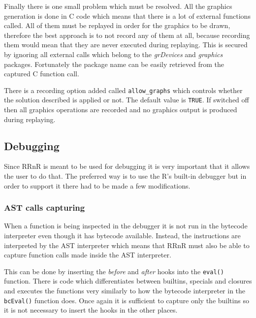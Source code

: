 \documentclass[thesis=M,english,hidelinks]{FITthesis}[2012/10/20]
\begin{document}
		Finally there is one small problem which must be resolved. All the graphics generation is done in C code which means that there is a lot of external functions called. All of them must be replayed in order for the graphics to be drawn, therefore the best approach is to not record any of them at all, because recording them would mean that they are never executed during replaying. This is secured by ignoring all external calls which belong to the \emph{grDevices} and \emph{graphics} packages. Fortunately the package name can be easily retrieved from the captured C function call.\par
		
		There is a recording option added called \lstinline|allow_graphs| which controls whether the solution described is applied or not. The default value is \lstinline|TRUE|. If switched off then all graphics operations are recorded and no graphics output is produced during replaying.\par
		
		\subsection{Debugging}
		Since RRnR is meant to be used for debugging it is very important that it allows the user to do that. The preferred way is to use the R's built-in debugger but in order to support it there had to be made a few modifications.\par
		
			\subsubsection{AST calls capturing}
			When a function is being inspected in the debugger it is not run in the bytecode interpreter even though it has bytecode available. Instead, the instructions are interpreted by the AST interpreter which means that RRnR must also be able to capture function calls made inside the AST interpreter.\par
			
			This can be done by inserting the \emph{before} and \emph{after} hooks into the \lstinline|eval()| function. There is code which differentiates between builtins, specials and closures and executes the functions very similarly to how the bytecode interpreter in the \lstinline|bcEval()| function does. Once again it is sufficient to capture only the builtins so it is not necessary to insert the hooks in the other places.\par
			
\end{document}

